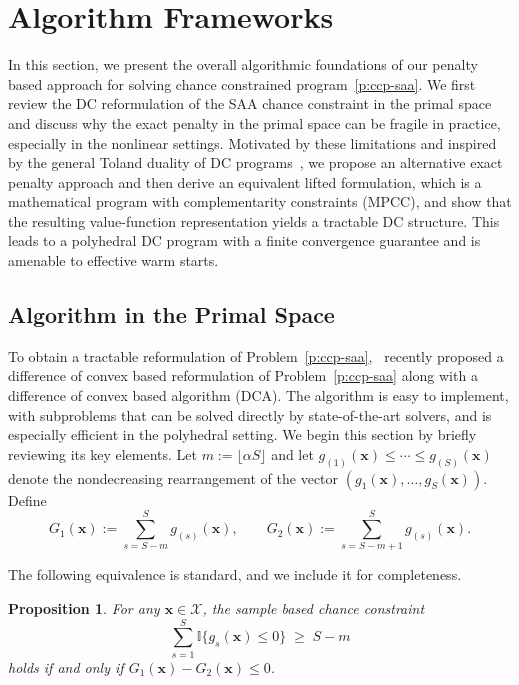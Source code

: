 \documentclass[11pt]{article}
\newtheorem{proposition}[theorem]{Proposition}
\def\mb{\mathbb}
\def\bs{\boldsymbol}
\def\X{\mathcal{X}}
\begin{document}
\section{Algorithm Frameworks}\label{sec:alg}

In this section, we present the overall algorithmic foundations of our penalty based approach for solving chance constrained program~\eqref{p:ccp-saa}. We first review the DC reformulation of the SAA chance constraint in the primal space and discuss why the exact penalty in the primal space can be fragile in practice, especially in the nonlinear settings. Motivated by these limitations and inspired by the general Toland duality of DC programs~\cite{toland1978duality}, we propose an alternative exact penalty approach and then derive an equivalent lifted formulation, which is a mathematical program with complementarity constraints (MPCC), and show that the resulting value-function representation yields a tractable DC structure. This leads to a polyhedral DC program with a finite convergence guarantee and is amenable to effective warm starts.

\subsection{Algorithm in the Primal Space}

To obtain a tractable reformulation of Problem~\eqref{p:ccp-saa},~\cite{wang2025proximal} recently proposed a difference of convex based reformulation of Problem~\eqref{p:ccp-saa} along with a difference of convex based algorithm (DCA). The algorithm is easy to implement, with subproblems that can be solved directly by state-of-the-art solvers, and is especially efficient in the polyhedral setting. We begin this section by briefly reviewing its key elements. Let $m:=\lfloor \alpha S\rfloor$ and let $g_{(1)}(\bs{x})\le\cdots\le g_{(S)}(\bs{x})$ denote the nondecreasing rearrangement of the vector $(g_1(\bs{x}),\dots,g_S(\bs{x}))$. Define
\begin{equation}\label{eq:G-def}
G_1(\bs{x}) := \sum_{s=S-m}^{S} g_{(s)}(\bs{x}), \qquad G_2(\bs{x}) := \sum_{s=S-m+1}^{S} g_{(s)}(\bs{x}).
\end{equation}

The following equivalence is standard, and we include it for completeness.

\begin{proposition}{\cite[lemma 1]{wang2025proximal}} 
\label{prop:equiv-cc}
For any $\bs{x}\in\X$, the sample based chance constraint
\begin{equation} \label{eq:sample-chance-constraint}
\sum_{s=1}^S \mb{I}\{g_s(\bs{x})\le 0\} \;\ge\; S-m
\end{equation}
holds if and only if $G_1(\bs{x}) - G_2(\bs{x}) \leq 0$.
\end{proposition}
\end{document}
